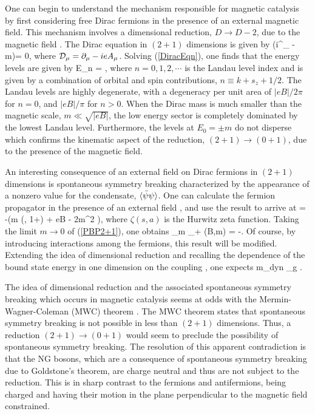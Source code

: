 \documentclass[aps,prd,twocolumn,showpacs,superscriptaddress,groupedaddress]{revtex4}  %
\begin{document}
One can begin to understand the mechanism responsible for magnetic catalysis by first considering free Dirac fermions in the presence of an external magnetic field. This mechanism involves a dimensional 
reduction, $D \to D-2$, due to the magnetic field \cite{Shovkovy}. The Dirac equation in $(2+1)$ dimensions is given by 
\beq
\label{DiracEqn}
(i\gamma^{\mu}\D_{\mu} - m)\Psi = 0,
\eeq
where ${\cal D}_{\mu} = \partial_{\mu} - ieA_{\mu}$.
Solving (\ref{DiracEqn}), one finds that the energy levels are given by 
\beq
\label{DiracEnergyLevels}
E_n = \pm {},
\eeq
where $n=0,1,2,\cdots$ is the Landau level index and is given by a combination of orbital and spin contributions, $n \equiv k + s_z + 1/2$. The Landau levels 
are highly degenerate, with a degeneracy per unit area of $|eB|/2\pi$ for $n=0$, and $|eB|/\pi$ for $n>0$. When the Dirac mass is much smaller than the magnetic scale, $m \ll \sqrt{|eB|}$, the low energy sector 
is completely dominated by the lowest Landau level. Furthermore, the levels at $E_0 = \pm m$ do not disperse which confirms the kinematic aspect of the reduction, $(2+1) \to (0+1)$, due to the presence of the magnetic field.

An interesting consequence of an external field on Dirac fermions in $(2+1)$ dimensions is spontaneous symmetry breaking characterized by the appearance of a nonzero value for the condensate, ${\langle {\bar \psi} \psi \rangle}$.
One can calculate the fermion propagator in the presence of an external field \cite{Schwinger}, and use the result to arrive at \cite{DittrichGies, DittrichReuter}
\beq
\label{PBP2+1}
\vev{\Bpsi \Psi} = -\left(m  \zeta \left(, 1+\right) + eB - 2m^2 \right),
\eeq
where $\zeta(s,a)$ is the Hurwitz zeta function. Taking the limit $m \to 0$ of (\ref{PBP2+1}), one obtains
\beq
\label{PBP2+1Final}
\lim_{m _+} \vev{\Bpsi \Psi}(B,m) = -.
\eeq
Of course, by introducing interactions among the fermions, this result will be modified. Extending the idea of dimensional reduction and recalling the dependence of the bound state energy in one dimension on the coupling \cite{LandauLifschitzQM}, one expects
\beq
\label{DynamicalMass}
m_{dyn} \propto \alpha_g .
\eeq

The idea of dimensional reduction and the associated spontaneous symmetry breaking which occurs in magnetic catalysis seems at odds with the Mermin-Wagner-Coleman (MWC) theorem \cite{MerminWagner,Coleman}. The MWC theorem
states that spontaneous symmetry breaking is not possible in less than $(2+1)$ dimensions. Thus, a reduction $(2+1) \to (0+1)$ would seem to preclude the possibility of spontaneous symmetry breaking. The resolution of
this apparent contradiction is that the NG bosons, which are a consequence of spontaneous symmetry breaking due to Goldstone's theorem, are charge neutral and thus are not subject to the reduction. This is in sharp
contrast to the fermions and antifermions, being charged and having their motion in the plane perpendicular to the magnetic field constrained.
\end{document}
